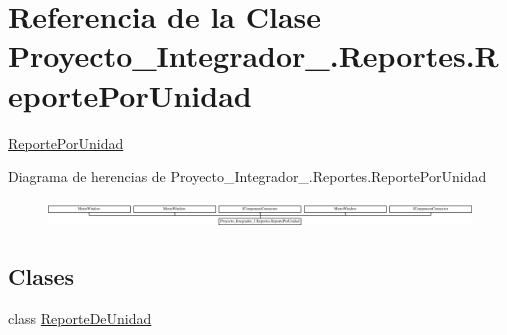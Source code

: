 \hypertarget{class_proyecto___integrador__3_1_1_reportes_1_1_reporte_por_unidad}{\section{Referencia de la Clase Proyecto\-\_\-\-Integrador\-\_.\-Reportes.\-Reporte\-Por\-Unidad}
\label{class_proyecto___integrador__3_1_1_reportes_1_1_reporte_por_unidad}
}


\hyperlink{class_proyecto___integrador__3_1_1_reportes_1_1_reporte_por_unidad}{Reporte\-Por\-Unidad}  


Diagrama de herencias de Proyecto\-\_\-\-Integrador\-\_.\-Reportes.\-Reporte\-Por\-Unidad\begin{figure}[H]
\begin{center}
\leavevmode
\includegraphics[height=0.720257cm]{class_proyecto___integrador__3_1_1_reportes_1_1_reporte_por_unidad}
\end{center}
\end{figure}
\subsection*{Clases}
\begin{DoxyCompactItemize}
\item 
class \hyperlink{class_proyecto___integrador__3_1_1_reportes_1_1_reporte_por_unidad_1_1_reporte_de_unidad}{Reporte\-De\-Unidad}
\end{DoxyCompactItemize}
